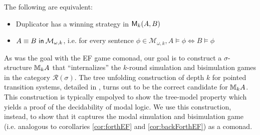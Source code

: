 \begin{prop}
The following are equivalent:
\begin{itemize}
\item Duplicator has a winning strategy in ${\mathsf{M}_{k}(A,B)}$
\item ${A \equiv B \ \mathsf{in}\: \mathcal{M}_{\omega,k}}$, i.e. for every sentence $\phi \in \mathcal{M}_{\omega,k}, A \vDash \phi \Leftrightarrow B \vDash \phi$
\end{itemize}
\end{prop}
As was the goal with the EF game comonad, our goal is to construct a $\sigma$-structure ${\mathbb{M}_{k}A}$ that ``internalizes'' the $k$-round simulation and bisimulation games in the category $\mathcal{R}(\sigma)$. The tree unfolding construction of depth $k$ for pointed transition systems, detailed in \cite{Gradel2014}, turns out to be the correct candidate for ${\mathbb{M}_{k}A}$. This construction is typically empolyed to show the tree-model property which yields a proof of the decidability of modal logic. We use this construction, instead, to show that it captures the modal simulation and bisimulation game (i.e. analogous to corollaries \ref{cor:forthEF} and \ref{cor:backForthEF}) as a comonad.
